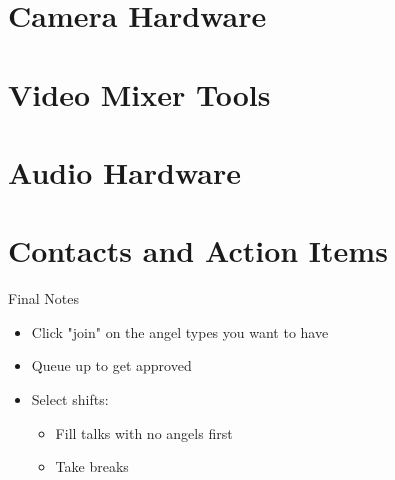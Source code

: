 \documentclass[aspectratio=169]{beamer}
\begin{document}
%
%


\section{Camera Hardware}
%

%



\section{Video Mixer Tools}



\section{Audio Hardware}
%




\section{Contacts and Action Items}

%
%

\begin{frame}{Final Notes}
	\begin{itemize}
		\item Click "join" on the angel types you want to have
		\item Queue up to get approved
		\item Select shifts:
		\begin{itemize}
			\item Fill talks with no angels first
			\item Take breaks
		\end{itemize}
	\end{itemize}
\end{frame}
\end{document}
